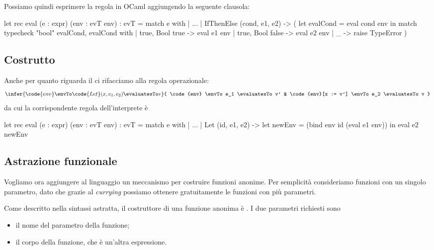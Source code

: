 Possiamo quindi esprimere la regola in OCaml aggiungendo la seguente clausola:
\begin{OCaml}
let rec eval (e : expr) (env : evT env) : evT =
  match e with
  | ...
  | IfThenElse (cond, e1, e2) -> 
    ( let evalCond = eval cond env in
        match typecheck "bool" evalCond, evalCond with 
        | true, Bool true   -> eval e1 env 
        | true, Bool false  -> eval e2 env 
        | _                 -> raise TypeError )
\end{OCaml}

\subsection*{Costrutto }

Anche per quanto riguarda il  ci rifacciamo alla regola operazionale: \[
    \infer{
        \code{env} \envTo \code{Let}(x, e_1, e_2) \evaluatesTo v
    }{
          \code{env} \envTo e_1 \evaluatesTo v'
        & \code{env}[x := v'] \envTo e_2 \evaluatesTo v
    }    
\] da cui la corrispondente regola dell'interprete è \begin{OCaml}
let rec eval (e : expr) (env : evT env) : evT =
  match e with
  | ...
  | Let (id, e1, e2) -> 
    let newEnv = (bind env id (eval e1 env)) in
      eval e2 newEnv
\end{OCaml}

\subsection*{Astrazione funzionale}

Vogliamo ora aggiungere al linguaggio un meccanismo per costruire funzioni anonime. Per semplicità consideriamo funzioni con un singolo parametro, dato che grazie al \emph{currying} possiamo ottenere gratuitamente le funzioni con più parametri.

Come descritto nella sintassi astratta, il costruttore di una funzione anonima è . I due parametri richiesti sono \begin{itemize}
    \item il nome del parametro della funzione;
    \item il corpo della funzione, che è un'altra espressione.
\end{itemize}

